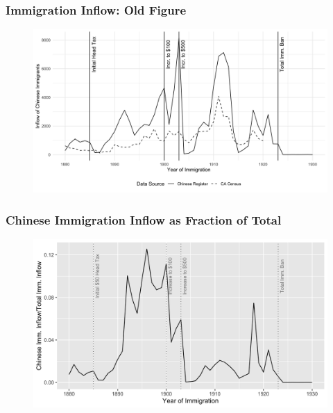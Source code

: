 \documentclass[pdf]{beamer}
\begin{document}
\begin{frame}[label = fig2_flow_old]
	\frametitle{Immigration Inflow: Old Figure}
    \centering
	\begin{figure}[H]
		\begin{center}
			\includegraphics[width=\textwidth]{../../figs/shortpaper_figs/fig2_flow.png}
		\end{center}
	\end{figure}
    \hyperlink{fig2_flow}{}
\end{frame}


\begin{frame}[label = flow_diff]
	\frametitle{Chinese Immigration Inflow as Fraction of Total}
    \centering
	\begin{figure}[H]
		\begin{center}
			\includegraphics[width=\textwidth]{../../figs/21jul23/flowpct.png}
		\end{center}
	\end{figure}
    \hyperlink{flow_reg}{}
\end{frame}
\end{document}
